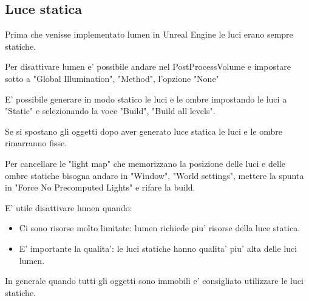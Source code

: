         \subsection{Luce statica}
            Prima che venisse implementato lumen in Unreal Engine le luci erano sempre statiche.

            \begin{notebox}
                Per disattivare lumen e' possibile andare nel PostProcessVolume e impostare sotto a "Global Illumination", "Method", l'opzione "None"
            \end{notebox}

            E' possibile generare in modo statico le luci e le ombre impostando le luci a "Static" e selezionando la voce "Build", "Build all levels".

            Se si spostano gli oggetti dopo aver generato luce statica le luci e le ombre rimarranno fisse.

            Per cancellare le "light map" che memorizzano la posizione delle luci e delle ombre statiche bisogna andare in "Window", "World settings", mettere la spunta in "Force No Precomputed Lights" e rifare la build.

            E' utile disattivare lumen quando:
            \begin{itemize}
                \item Ci sono risorse molto limitate: lumen richiede piu' risorse della luce statica.
                \item E' importante la qualita': le luci statiche hanno qualita' piu' alta delle luci lumen.
            \end{itemize}
            In generale quando tutti gli oggetti sono immobili e' consigliato utilizzare le luci statiche.

